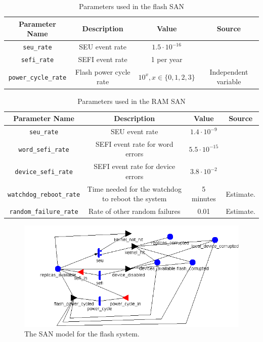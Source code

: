 \begin{table}[width = 0.5\textwidth]
\centering
\begin{tabular}{|c|c|c|c|}
\hline
{\bf Parameter Name} & {\bf Description} & {\bf Value} & {\bf Source}\\
\hline
\texttt{seu\_rate} & SEU event rate & $1.5\cdot 10^{-16}$ & \cite{Oldham2008TID} \\
\texttt{sefi\_rate} & SEFI event rate & 1 per year & \cite{Oldham2008TID} \\
\texttt{power\_cycle\_rate} & Flash power cycle rate & $10^x, x\in\{0, 1, 2, 3\}$ & Independent variable \\
\hline
\end{tabular}
\caption{Parameters used in the flash SAN}
\label{tab:flashparameters}
\end{table}

\begin{table}[width = 0.5\textwidth]
\centering
\begin{tabular}{|c|c|c|c|}
\hline
{\bf Parameter Name} & {\bf Description} & {\bf Value} & {\bf Source}\\
\hline
\texttt{seu\_rate} & SEU event rate & $1.4 \cdot 10^{-9}$ & \cite{Gliem2012Memory} \\
\texttt{word\_sefi\_rate} & SEFI event rate for word errors & $5.5 \cdot 10^{-15}$ & \cite{Gliem2012Memory} \\
\texttt{device\_sefi\_rate} & SEFI event rate for device errors & $3.8 \cdot 10^{-2}$ & \cite{Gliem2012Memory} \\
\texttt{watchdog\_reboot\_rate} & Time needed for the watchdog to reboot the system & 5 minutes & Estimate.\\
\texttt{random\_failure\_rate} & Rate of other random failures & 0.01 & Estimate.\\
\hline
\end{tabular}
\caption{Parameters used in the RAM SAN}
\label{tab:ramparameters}
\end{table}

\begin{figure}
\centering
\includegraphics[scale=0.8]{pretty_redundant_controller_flash_system}
\caption{The SAN model for the flash system.}
\label{fig:flashsan}
\end{figure}


